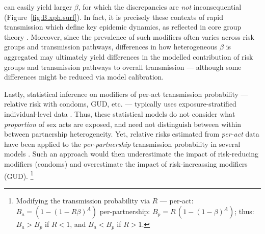 can easily yield larger $\beta$, for which the discrepancies are \emph{not} inconsequential
(\eg Figure~\ref{fig:B.xph.surf}).
In fact, it is precisely these contexts of rapid transmission which define key epidemic dynamics,
as reflected in core group theory \cite{Watts2010}.
Moreover, since the prevalence of such modifiers
often varies across risk groups and transmission pathways,
differences in how heterogeneous $\beta$ is aggregated may ultimately yield
differences in the modelled contribution of risk groups and transmission pathways
to overall transmission --- although some differences might be reduced via model calibration.
\par
Lastly, statistical inference on modifiers of per-act transmission probability
--- \eg relative risk with condoms, GUD, etc. --- typically uses
exposure-stratified individual-level data \cite{Jewell1990,Gray2001,Wawer2005,Boily2009}.
Thus, these statistical models do not consider what \emph{proportion} of sex acts are exposed,
and need not distinguish between within \vs between partnership heterogeneity.
Yet, relative risks estimated from \emph{per-act} data
have been applied to the \emph{per-partnership} transmission probability in several models
\cite{TOOD}. %
Such an approach would then
underestimate the impact of risk-reducing modifiers (\eg condoms) and
overestimate the impact of risk-increassing modifiers (\eg GUD).%
\footnote{Modifying the transmission probability via $R$ ---
  per-act: $B_a = (1 - {(1 - R\beta)}^A)$ \vs per-partnership: $B_p = R\,(1 - {(1 - \beta)}^A)$;
  thus: $B_a > B_p$ if $R < 1$, and $B_a < B_p$ if $R > 1$.}
